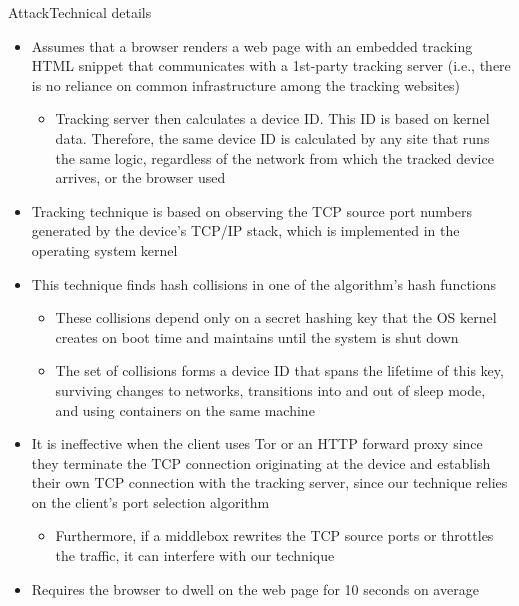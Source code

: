 \documentclass[aspectratio=169, hyperref={colorlinks=true, allcolors=SecondaryColor}, c]{beamer}
\begin{document}
\begin{frame}[fragile]{Attack}{Technical details}
\begin{itemize}
			\item Assumes that a browser renders a web page with an embedded tracking HTML snippet that communicates with a 1st-party tracking server (i.e., there is no reliance on common infrastructure among the tracking websites)
			\begin{itemize}
				\item Tracking server then calculates a device ID. This ID is based on kernel data. Therefore, the same device ID is calculated by any site that runs the same logic, regardless of the network from which the tracked device arrives, or the browser used
			\end{itemize}
			\item Tracking technique is based on observing the TCP source port numbers generated by the device’s TCP/IP stack, which is implemented in the operating system kernel
			\item This technique finds hash collisions in one of the algorithm’s hash functions
			\begin{itemize}
				\item These collisions depend only on a secret hashing key that the OS kernel creates on boot time and maintains until the system is shut down
				\item The set of collisions forms a device ID that spans the lifetime of this key, surviving changes to networks, transitions into and out of sleep mode, and using containers on the same machine
			\end{itemize}
			\item It is ineffective when the client uses Tor or an HTTP forward proxy since they terminate the TCP connection originating at the device and establish their own TCP connection with the tracking server, since our technique relies on the client’s port selection algorithm
			\begin{itemize}
				\item Furthermore, if a middlebox rewrites the TCP source ports or throttles the traffic, it can interfere with our technique
			\end{itemize}
			\item Requires the browser to dwell on the web page for 10 seconds on average

\end{itemize}
\end{frame}
\end{document}

